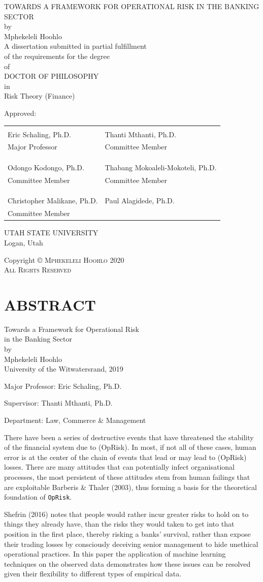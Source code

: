 \documentclass{DissertateUSU}
\renewcommand{\maketitle}{
	\thispagestyle{empty}
	\vspace*{\fill}
	\begin{center}
	\doublespaced
	\MakeUppercase{Towards a Framework for Operational Risk in the Banking Sector}\\
	by\\
	Mphekeleli Hoohlo \\
	\singlespaced
	A dissertation submitted in partial fulfillment\\
	of the requirements for the degree \\
	\doublespaced
	of\\
	\MakeUppercase{Doctor of Philosophy} \\
	in\\
	\singlespaced
  Risk Theory (Finance) \\
	\end{center}

	\vspace{20pt}
	\noindent Approved: \\
	\vspace{30pt}
	\noindent
	\begin{tabular}{ll}
    \makebox[2.75in]{\hrulefill} & \makebox[2.75in]{\hrulefill}\\
    Eric Schaling, Ph.D.                      & Thanti Mthanti, Ph.D. \\
    Major Professor              & Committee Member \\
    & \\
    & \\
    \makebox[2.75in]{\hrulefill} & \makebox[2.75in]{\hrulefill}\\
    Odongo Kodongo, Ph.D.                 & Thabang Mokoaleli-Mokoteli, Ph.D. \\
    Committee Member             & Committee Member \\
    & \\
    & \\
    \makebox[2.75in]{\hrulefill} & \makebox[2.75in]{\hrulefill}\\
    Christopher Malikane, Ph.D.                 & Paul Alagidede, Ph.D. \\
    Committee Member             &  \\

    \end{tabular}

  \vspace{20pt}
    \begin{center}
	  \singlespacing
      UTAH STATE UNIVERSITY\\
	    Logan, Utah\\
	    \doublespacing
	    2020
	  \end{center}
	\vspace*{\fill}
	\clearpage
}
\newcommand{\copyrightpage}{
	\vspace*{\fill}
  \begin{center}
	\doublespacing
	Copyright \hspace{3pt}
	  \scshape \small \copyright  \hspace{3pt}
	  Mphekeleli Hoohlo \hspace{3pt} 2020 \\
	All Rights Reserved
  \end{center}
	\vspace*{\fill}
}
\begin{document}
\maketitle

\pagestyle{empty}
\copyrightpage


\newpage
\pagestyle{fancy}
\fancyhead[R]{\thepage}
\fancyfoot[C]{}
\chapter*{ABSTRACT}

\doublespacing
\begin{center}
Towards a Framework for Operational Risk \\ 
in the Banking Sector \\
\vspace{12pt}
by \\
\vspace{12pt}
Mphekeleli Hoohlo \\
University of the Witwatersrand, 2019
\end{center}

\vspace{12pt}

\singlespacing

\noindent Major Professor: Eric Schaling, Ph.D.

\noindent Supervisor: Thanti Mthanti, Ph.D.

\noindent Department: Law, Commerce \& Management

\vspace{12pt}

\doublespacing

There have been a series of destructive events that have threatened the
stability of the financial system due to (OpRisk). In most, if not all
of these cases, human error is at the center of the chain of events that
lead or may lead to (OpRisk) losses. There are many attitudes that can
potentially infect organisational processes, the most persistent of
these attitudes stem from human failings that are exploitable Barberis
\& Thaler (2003), thus forming a basis for the theoretical foundation of
\texttt{OpRisk}.

Shefrin (2016) notes that people would rather incur greater risks to
hold on to things they already have, than the risks they would taken to
get into that position in the first place, thereby risking a banks'
survival, rather than expose their trading losses by consciously
deceiving senior management to hide unethical operational practices. In
this paper the application of machine learning techniques on the
observed data demonstrates how these issues can be resolved given their
flexibility to different types of empirical data.
\end{document}
